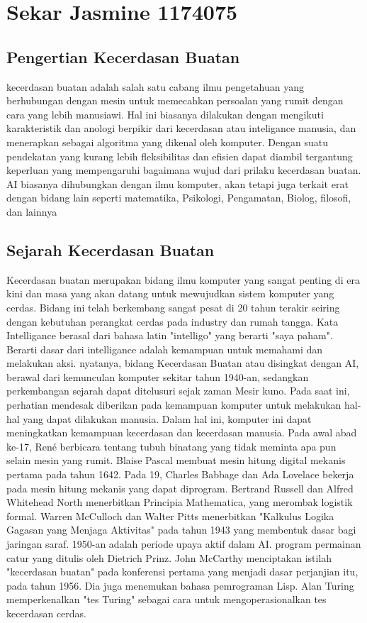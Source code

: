 \section{Sekar Jasmine 1174075}
\subsection{Pengertian Kecerdasan Buatan}
kecerdasan buatan adalah salah satu cabang ilmu pengetahuan yang berhubungan dengan mesin untuk memecahkan persoalan yang rumit dengan cara yang lebih manusiawi. Hal ini biasanya dilakukan dengan mengikuti karakteristik dan anologi berpikir dari kecerdasan  atau inteligance manusia, dan menerapkan sebagai algoritma yang dikenal oleh komputer.
Dengan suatu pendekatan yang kurang lebih fleksibilitas dan efisien dapat diambil tergantung keperluan yang mempengaruhi bagaimana wujud dari prilaku kecerdasan buatan. AI biasanya dihubungkan dengan ilmu komputer, akan tetapi juga terkait erat dengan bidang lain seperti matematika, Psikologi, Pengamatan, Biolog, filosofi, dan lainnya
\subsection{Sejarah Kecerdasan Buatan}
Kecerdasan buatan merupakan bidang ilmu komputer yang sangat penting di era kini dan masa yang akan datang untuk mewujudkan sistem komputer yang cerdas. Bidang ini telah berkembang sangat pesat di 20 tahun terakir seiring dengan kebutuhan perangkat cerdas pada industry dan rumah tangga.
Kata Intelligance berasal dari bahasa latin "intelligo" yang berarti "saya paham". Berarti dasar dari intelligance adalah kemampuan untuk memahami dan melakukan aksi. nyatanya, bidang Kecerdasan Buatan atau disingkat dengan AI, berawal dari kemunculan komputer sekitar tahun 1940-an, sedangkan perkembangan sejarah dapat ditelusuri sejak zaman Mesir kuno. Pada saat ini, perhatian mendesak diberikan pada kemampuan komputer untuk melakukan hal-hal yang dapat dilakukan manusia. Dalam hal ini, komputer ini dapat meningkatkan kemampuan kecerdasan dan kecerdasan manusia.
Pada awal abad ke-17, René berbicara tentang tubuh binatang yang tidak meminta apa pun selain mesin yang rumit. Blaise Pascal membuat mesin hitung digital mekanis pertama pada tahun 1642. Pada 19, Charles Babbage dan Ada Lovelace bekerja pada mesin hitung mekanis yang dapat diprogram. Bertrand Russell dan Alfred Whitehead North menerbitkan Principia Mathematica, yang merombak logistik formal. Warren McCulloch dan Walter Pitts menerbitkan "Kalkulus Logika Gagasan yang Menjaga Aktivitas" pada tahun 1943 yang membentuk dasar bagi jaringan saraf.
1950-an adalah periode upaya aktif dalam AI. program permainan catur yang ditulis oleh Dietrich Prinz. John McCarthy menciptakan istilah "kecerdasan buatan" pada konferensi pertama yang menjadi dasar perjanjian itu, pada tahun 1956. Dia juga menemukan bahasa pemrograman Lisp. Alan Turing memperkenalkan "tes Turing" sebagai cara untuk mengoperasionalkan tes kecerdasan cerdas. 
